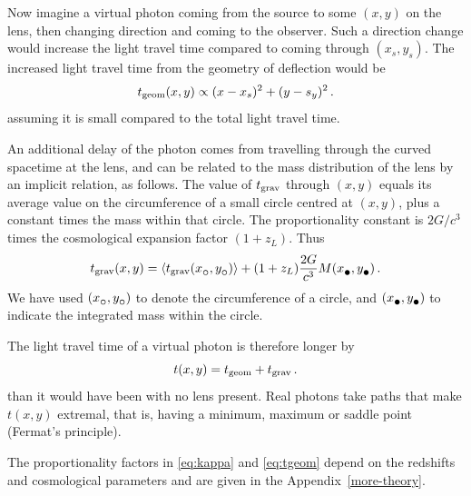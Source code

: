 Now imagine a virtual photon coming from the source to some $(x,y)$ on
the lens, then changing direction and coming to the observer.  Such a
direction change would increase the light travel time compared to
coming through $(x_s,y_s)$.  The increased light travel time from the
geometry of deflection would be
\begin{equation} \label{eq:tgeom}
t_{\rm geom}(x,y) \propto (x-x_s)^2 + (y-s_y)^2 \,.
\end{equation}
assuming it is small compared to the total light travel time.

An additional delay of the photon comes from travelling through the
curved spacetime at the lens, and can be related to the mass
distribution of the lens by an implicit relation, as follows.  The
value of $t_{\rm grav}$ through $(x,y)$ equals its average value on the
circumference of a small circle centred at $(x,y)$, plus a constant
times the mass within that circle.  The proportionality constant is
$2G/c^3$ times the cosmological expansion factor $(1+z_L)$. Thus
\begin{equation} \label{eq:tgrav}
\tgrav(x,y) = \left\langle \tgrav(x_\subcirc,y_\subcirc) \right\rangle
              + (1+z_L) \frac{2G}{c^3} M(x_\subbullet,y_\subbullet) \,.
\end{equation}
We have used $(x_\subcirc,y_\subcirc)$ to denote the circumference of
a circle, and $(x_\subbullet,y_\subbullet)$ to indicate the integrated
mass within the circle.

The light travel time of a virtual photon is therefore longer by
\begin{equation}  \label{eq:tarriv}
t(x,y) = t_{\rm geom} + t_{\rm grav} \,.
\end{equation}
than it would have been with no lens present.  Real photons take paths
that make $t(x,y)$ extremal, that is, having a minimum, maximum or
saddle point (Fermat's principle).

The proportionality factors in \eqref{eq:kappa} and \eqref{eq:tgeom}
depend on the redshifts and cosmological parameters and are given in
the Appendix~\ref{more-theory}.

